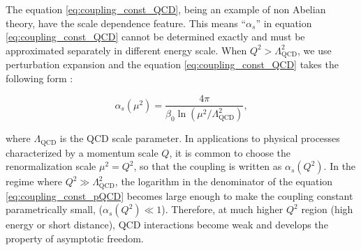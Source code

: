 The equation \ref{eq:coupling_const_QCD}, being an example of non Abelian theory, have the scale dependence feature. This means ``$\alpha_s$'' in equation \ref{eq:coupling_const_QCD} cannot be determined exactly and must be approximated separately in different energy scale. When $Q^2 > \Lambda_{\mathrm{QCD}}^2$, we use perturbation expansion and the equation \ref{eq:coupling_const_QCD} takes the following form \cite{deur2016qcd}:

\begin{equation}
\alpha_s(\mu^2)
=
\frac{4\pi}{\beta_0 \ln\!\left(\mu^2/\Lambda_{\mathrm{QCD}}^2\right)},
\label{eq:coupling_const_pQCD}
\end{equation}

where $\Lambda_{\mathrm{QCD}}$ is the \ac{QCD} scale parameter. In applications to physical processes characterized by a momentum scale $Q$, it is common to choose the renormalization scale $\mu^2 = Q^2$, so that the coupling is written as $\alpha_s(Q^2)$. In the regime where $Q^2 \gg \Lambda_{\mathrm{QCD}}^2$, the logarithm in the denominator of the equation \ref{eq:coupling_const_pQCD} becomes large enough to make the coupling constant parametrically small, ($\alpha_s(Q^2) \ll 1$). Therefore, at much higher $Q^2$ region (high energy or short distance), \ac{QCD} interactions become weak and develops the property of asymptotic freedom.


